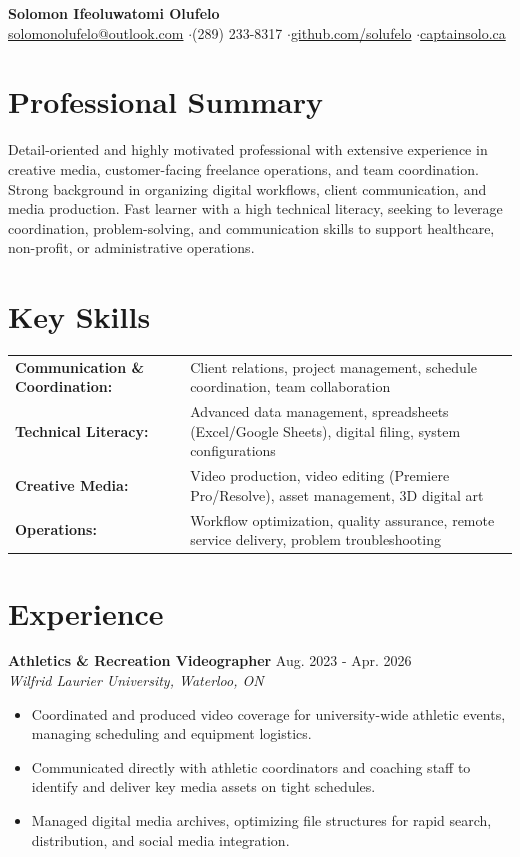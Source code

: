 \documentclass[a4paper,10pt]{article}
\begin{document}
\begin{center}
    {\LARGE \textbf{Solomon Ifeoluwatomi Olufelo}} \\[2pt]
    \href{mailto:solomonolufelo@outlook.com}{solomonolufelo@outlook.com} \enspace$\cdot$\enspace (289) 233-8317 \enspace$\cdot$\enspace \href{https://github.com/solufelo}{github.com/solufelo} \enspace$\cdot$\enspace \href{https://captainsolo.ca}{captainsolo.ca}
\end{center}

\section*{Professional Summary}
Detail-oriented and highly motivated professional with extensive experience in creative media, customer-facing freelance operations, and team coordination. Strong background in organizing digital workflows, client communication, and media production. Fast learner with a high technical literacy, seeking to leverage coordination, problem-solving, and communication skills to support healthcare, non-profit, or administrative operations.

\section*{Key Skills}
\begin{tabularx}{\textwidth}{@{}lX@{}}
\textbf{Communication \& Coordination:} & Client relations, project management, schedule coordination, team collaboration \\
\textbf{Technical Literacy:} & Advanced data management, spreadsheets (Excel/Google Sheets), digital filing, system configurations \\
\textbf{Creative Media:} & Video production, video editing (Premiere Pro/Resolve), asset management, 3D digital art \\
\textbf{Operations:} & Workflow optimization, quality assurance, remote service delivery, problem troubleshooting \\
\end{tabularx}

\section*{Experience}
\textbf{Athletics \& Recreation Videographer} \hfill Aug. 2023 - Apr. 2026 \\
\textit{Wilfrid Laurier University, Waterloo, ON}
\begin{itemize}
    \item Coordinated and produced video coverage for university-wide athletic events, managing scheduling and equipment logistics.
    \item Communicated directly with athletic coordinators and coaching staff to identify and deliver key media assets on tight schedules.
    \item Managed digital media archives, optimizing file structures for rapid search, distribution, and social media integration.
\end{itemize}
\end{document}
